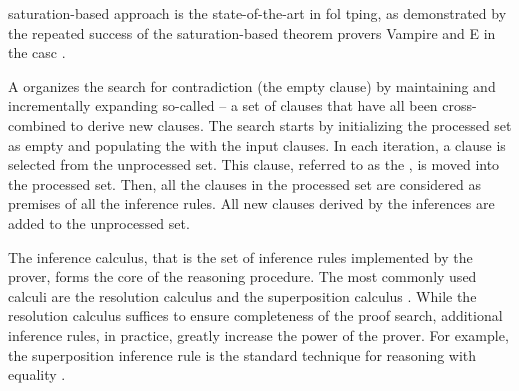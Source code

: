 \Gls{saturation}-based approach is the state-of-the-art in \gls{fol} \gls{tping},
as demonstrated by the repeated success of the saturation-based theorem provers Vampire \cite{DBLP:conf/cav/KovacsV13} and E \cite{DBLP:conf/cade/0001CV19} in the \gls{casc} \cite{Sut16}.

A  organizes the search for contradiction
(the empty clause)
by maintaining and incrementally expanding so-called  -- a set of clauses that have all been cross-combined to derive new clauses.
The search starts by initializing the processed set as empty and populating the  with the input clauses.
In each iteration,
a clause is selected from the unprocessed set.
This clause, referred to as the , is moved into the processed set.
Then, all the clauses in the processed set are considered as premises of all the inference rules.
All new clauses derived by the inferences are added to the unprocessed set.


The inference calculus, that is the set of inference rules implemented by the prover, forms the core of the reasoning procedure.
The most commonly used calculi are the resolution calculus \cite{} and the superposition calculus \cite{}.
While the resolution calculus suffices to ensure completeness of the proof search,
additional inference rules, in practice, greatly increase the power of the prover.
For example, the superposition inference rule is the standard technique for reasoning with equality \cite{}.



